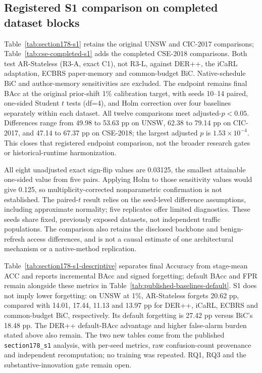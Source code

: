\documentclass[10pt,twocolumn]{article}
\begin{document}


\subsection{Registered S1 comparison on completed dataset blocks}
Table~\ref{tab:section178-s1} retains the original UNSW and CIC-2017 comparisons; Table~\ref{tab:cse-completed-s1} adds the completed CSE-2018 comparisons. Both test AR-Stateless (R3-A, exact C1), not R3-L, against DER++, the iCaRL adaptation, ECBRS paper-memory and common-budget BiC. Native-schedule BiC and author-memory sensitivities are excluded. The endpoint remains final BAcc at the original prior-shift 1\% calibration target, with seeds 10--14 paired, one-sided Student $t$ tests (df=4), and Holm correction over four baselines separately within each dataset. All twelve comparisons meet adjusted-$p<0.05$. Differences range from 49.98 to 53.63 pp on UNSW, 62.38 to 79.14 pp on CIC-2017, and 47.14 to 67.37 pp on CSE-2018; the largest adjusted $p$ is $1.53\times10^{-4}$. This closes that registered endpoint comparison, not the broader research gates or historical-runtime harmonization.

All eight unadjusted exact sign-flip values are 0.03125, the smallest attainable one-sided value from five pairs. Applying Holm to those sensitivity values would give 0.125, so multiplicity-corrected nonparametric confirmation is not established. The paired-$t$ result relies on the seed-level difference assumptions, including approximate normality; five replicates offer limited diagnostics. These seeds share fixed, previously exposed datasets, not independent traffic populations. The comparison also retains the disclosed backbone and benign-refresh access differences, and is not a causal estimate of one architectural mechanism or a native-method replication.

Table~\ref{tab:section178-s1-descriptive} separates final Accuracy from stage-mean ACC and reports incremental BAcc and signed forgetting; default BAcc and FPR remain alongside these metrics in Table~\ref{tab:published-baselines-default}. S1 does not imply lower forgetting: on UNSW at 1\%, AR-Stateless forgets 20.62 pp, compared with 14.01, 17.44, 11.13 and 13.97 pp for DER++, iCaRL, ECBRS and common-budget BiC, respectively. Its default forgetting is 27.42 pp versus BiC's 18.48 pp. The DER++ default-BAcc advantage and higher false-alarm burden stated above also remain. The two new tables come from the published \texttt{section178\_s1} analysis, with per-seed metrics, raw confusion-count provenance and independent recomputation; no training was repeated. RQ1, RQ3 and the substantive-innovation gate remain open.

\end{document}
